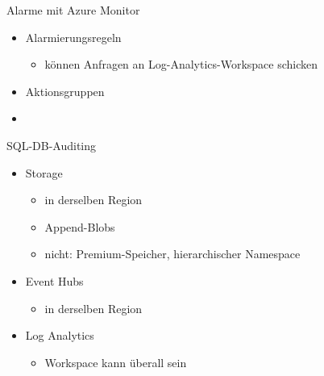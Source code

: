 \begin{flashcard}[Definition]{Alarme mit Azure Monitor}
  \begin{itemize}
    \item Alarmierungsregeln
      \begin{itemize}
        \item können Anfragen an Log-Analytics-Workspace schicken
      \end{itemize}
    \item Aktionsgruppen
    \item 
  \end{itemize}
\end{flashcard}

\begin{flashcard}[Definition]{SQL-DB-Auditing}
  \begin{itemize}
    \item Storage
      \begin{itemize}
        \item in derselben Region
        \item Append-Blobs
        \item[!] nicht: Premium-Speicher, hierarchischer Namespace
      \end{itemize}
    \item Event Hubs
      \begin{itemize}
        \item in derselben Region
      \end{itemize}
    \item Log Analytics
      \begin{itemize}
        \item Workspace kann überall sein
      \end{itemize}
  \end{itemize}
\end{flashcard}



